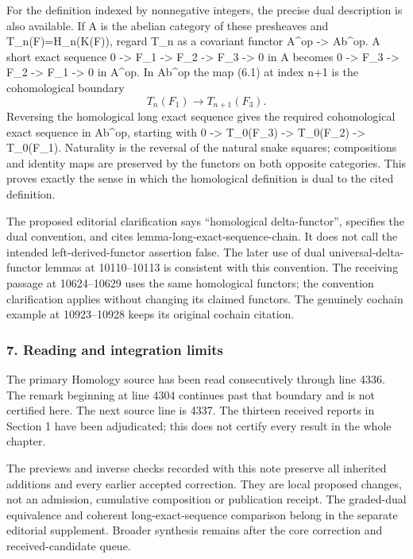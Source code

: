 For the definition indexed by nonnegative integers, the precise dual description is also available. If A is the abelian category of these presheaves and T\_n(F)=H\_n(K(F)), regard T\_n as a covariant functor A\^{}op -\textgreater{} Ab\^{}op. A short exact sequence 0 -\textgreater{} F\_1 -\textgreater{} F\_2 -\textgreater{} F\_3 -\textgreater{} 0 in A becomes 0 -\textgreater{} F\_3 -\textgreater{} F\_2 -\textgreater{} F\_1 -\textgreater{} 0 in A\^{}op. In Ab\^{}op the map (6.1) at index n+1 is the cohomological boundary \[
T_n(F_1)\longrightarrow T_{n+1}(F_3).
\] Reversing the homological long exact sequence gives the required cohomological exact sequence in Ab\^{}op, starting with 0 -\textgreater{} T\_0(F\_3) -\textgreater{} T\_0(F\_2) -\textgreater{} T\_0(F\_1). Naturality is the reversal of the natural snake squares; compositions and identity maps are preserved by the functors on both opposite categories. This proves exactly the sense in which the homological definition is dual to the cited definition.

The proposed editorial clarification says ``homological delta-functor'', specifies the dual convention, and cites lemma-long-exact-sequence-chain. It does not call the intended left-derived-functor assertion false. The later use of dual universal-delta-functor lemmas at 10110--10113 is consistent with this convention. The receiving passage at 10624--10629 uses the same homological functors; the convention clarification applies without changing its claimed functors. The genuinely cochain example at 10923--10928 keeps its original cochain citation.

\subsubsection{7. Reading and integration limits}\label{reading-and-integration-limits}

The primary Homology source has been read consecutively through line 4336. The remark beginning at line 4304 continues past that boundary and is not certified here. The next source line is 4337. The thirteen received reports in Section 1 have been adjudicated; this does not certify every result in the whole chapter.

The previews and inverse checks recorded with this note preserve all inherited additions and every earlier accepted correction. They are local proposed changes, not an admission, cumulative composition or publication receipt. The graded-dual equivalence and coherent long-exact-sequence comparison belong in the separate editorial supplement. Broader synthesis remains after the core correction and received-candidate queue.
